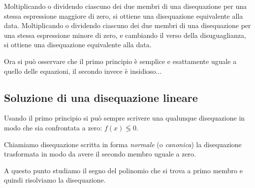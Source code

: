 \begin{principio}[II principio]
Moltiplicando o dividendo ciascuno dei due membri di
una disequazione per una stessa espressione maggiore di zero, 
si ottiene una disequazione equivalente alla data.
Moltiplicando o dividendo ciascuno dei due membri di
una disequazione per una stessa espressione minore di zero, 
e cambiando il verso della disuguaglianza,
si ottiene una disequazione equivalente alla data.
\end{principio}

Ora si può osservare che il primo principio è semplice e esattamente uguale a 
quello delle equazioni, il secondo invece è insidioso... 

\subsection{Soluzione di una disequazione lineare}

Usando il primo principio si può sempre scrivere una qualunque disequazione 
in modo che sia confrontata a zero: \(f(x) \lessgtr 0\). 

Chiamiamo disequazione scritta in forma \emph{normale} (o \emph{canonica})
la disequazione trasformata in modo da avere il secondo membro uguale a zero.

A questo punto studiamo il segno del polinomio che si trova a primo 
membro e quindi risolviamo la disequazione.

